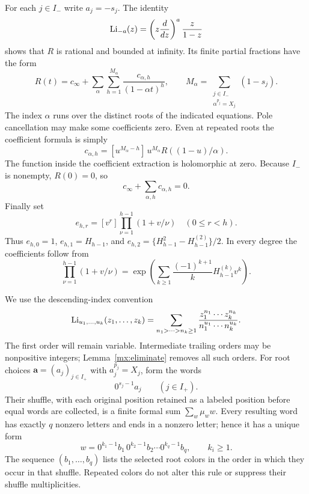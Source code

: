 For each $j\in I_-$ write $a_j=-s_j$.  The identity
\[
 \operatorname{Li}_{-a}(z)=\left(z\frac{d}{dz}\right)^a\frac z{1-z}
\]
shows that $R$ is rational and bounded at infinity.  Its finite partial
fractions have the form
\begin{equation}\label{mx:partial}
 R(t)=c_\infty+
       \sum_\alpha\sum_{h=1}^{M_\alpha}
          \frac{c_{\alpha,h}}{(1-\alpha t)^h},\qquad
 M_\alpha=\sum_{\substack{j\in I_-\\\alpha^{p_j}=X_j}}(1-s_j).
\end{equation}
The index $\alpha$ runs over the distinct roots of the indicated
equations.  Pole cancellation may make some coefficients zero.  Even
at repeated roots the coefficient formula is simply
\begin{equation}\label{mx:polecoeff}
 c_{\alpha,h}
 =[u^{M_\alpha-h}]\,u^{M_\alpha}R((1-u)/\alpha).
\end{equation}
The function inside the coefficient extraction is holomorphic at zero.
Because $I_-$ is nonempty, $R(0)=0$, so
\begin{equation}\label{mx:constantcancel}
 c_\infty+\sum_{\alpha,h}c_{\alpha,h}=0.
\end{equation}
Finally set
\begin{equation}\label{mx:e}
 e_{h,r}=[v^r]\prod_{\nu=1}^{h-1}(1+v/\nu)
 \quad(0\leq r<h).
\end{equation}
Thus $e_{h,0}=1$, $e_{h,1}=H_{h-1}$, and
$e_{h,2}=\{H_{h-1}^2-H_{h-1}^{(2)}\}/2$.  In every degree the
coefficients follow from
\[
 \prod_{\nu=1}^{h-1}(1+v/\nu)
 =\exp\!\left(\sum_{k\geq1}
          \frac{(-1)^{k+1}}kH_{h-1}^{(k)}v^k\right).
\]

We use the descending-index convention
\begin{equation}\label{mx:mpl}
 \operatorname{Li}_{u_1,\ldots,u_k}(z_1,\ldots,z_k)
 =\sum_{n_1>\cdots>n_k\geq1}
       \frac{z_1^{n_1}\cdots z_k^{n_k}}
            {n_1^{u_1}\cdots n_k^{u_k}}.
\end{equation}
The first order will remain variable.  Intermediate trailing orders
may be nonpositive integers; Lemma~\ref{mx:eliminate} removes all such
orders.  For root choices $\mathbf a=(a_j)_{j\in I_+}$ with
$a_j^{p_j}=X_j$, form the words
\[
 0^{s_j-1}a_j\qquad(j\in I_+).
\]
Their shuffle, with each original position retained as a labeled
position before equal words are collected, is a finite formal sum
$\sum_w\mu_w w$.  Every resulting word has exactly $q$ nonzero
letters and ends in a nonzero letter; hence it has a unique form
\begin{equation}\label{mx:word}
 w=0^{k_1-1}b_1\,0^{k_2-1}b_2\cdots0^{k_q-1}b_q,
 \qquad k_i\geq1.
\end{equation}
The sequence $(b_1,\ldots,b_q)$ lists the selected root colors in the
order in which they occur in that shuffle.  Repeated colors do not
alter this rule or suppress their shuffle multiplicities.

